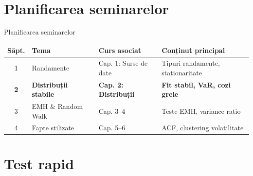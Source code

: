 \documentclass[9pt, aspectratio=169, t]{beamer}
\theoremstyle{definition}
\begin{document}
\section{Planificarea seminarelor}

\begin{frame}{Planificarea seminarelor}
\renewcommand{\arraystretch}{1.3}
\begin{center}
\begin{tabular}{clll}
\toprule
\textbf{Săpt.} & \textbf{Tema} & \textbf{Curs asociat} & \textbf{Conținut principal} \\
\midrule
1 & Randamente & Cap. 1: Surse de date & Tipuri randamente, staționaritate \\
\rowcolor{MainBlue!10}
\textbf{2} & \textbf{Distribuții stabile} & \textbf{Cap. 2: Distribuții} & \textbf{Fit stabil, VaR, cozi grele} \\
3 & EMH \& Random Walk & Cap. 3--4 & Teste EMH, variance ratio \\
4 & Fapte stilizate & Cap. 5--6 & ACF, clustering volatilitate \\
\bottomrule
\end{tabular}
\end{center}
\end{frame}

\section{Test rapid}
\end{document}
